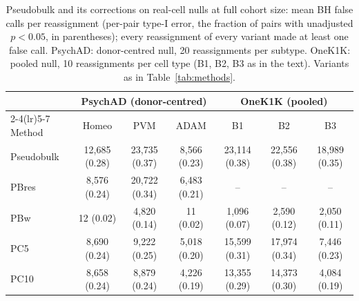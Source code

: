 \begin{table}[t]\centering\small\setlength{\tabcolsep}{4pt}
\caption{Pseudobulk and its corrections on real-cell nulls at full cohort size: mean BH false calls per reassignment (per-pair type-I error, the fraction of pairs with unadjusted $p<0.05$, in parentheses); every reassignment of every variant made at least one false call. PsychAD: donor-centred null, 20 reassignments per subtype. OneK1K: pooled null, 10 reassignments per cell type (B1, B2, B3 as in the text). Variants as in Table~\ref{tab:methods}.}\label{tab:pbfix}
\begin{tabular}{lcccccc}\toprule & \multicolumn{3}{c}{PsychAD (donor-centred)} & \multicolumn{3}{c}{OneK1K (pooled)}\\\cmidrule(lr){2-4}\cmidrule(lr){5-7}
Method & Homeo & PVM & ADAM & B1 & B2 & B3\\\midrule
Pseudobulk & 12{,}685 (0.28) & 23{,}735 (0.37) & 8{,}566 (0.23) & 23{,}114 (0.38) & 22{,}556 (0.38) & 18{,}989 (0.35)\\
PBres & 8{,}576 (0.24) & 20{,}722 (0.34) & 6{,}483 (0.21) & -- & -- & --\\
PBw & 12 (0.02) & 4{,}820 (0.14) & 11 (0.02) & 1{,}096 (0.07) & 2{,}590 (0.12) & 2{,}050 (0.11)\\
PC5 & 8{,}690 (0.24) & 9{,}222 (0.25) & 5{,}018 (0.20) & 15{,}599 (0.31) & 17{,}974 (0.34) & 7{,}446 (0.23)\\
PC10 & 8{,}658 (0.24) & 8{,}879 (0.24) & 4{,}226 (0.19) & 13{,}355 (0.29) & 14{,}373 (0.30) & 4{,}084 (0.19)\\
\bottomrule\end{tabular}\end{table}
